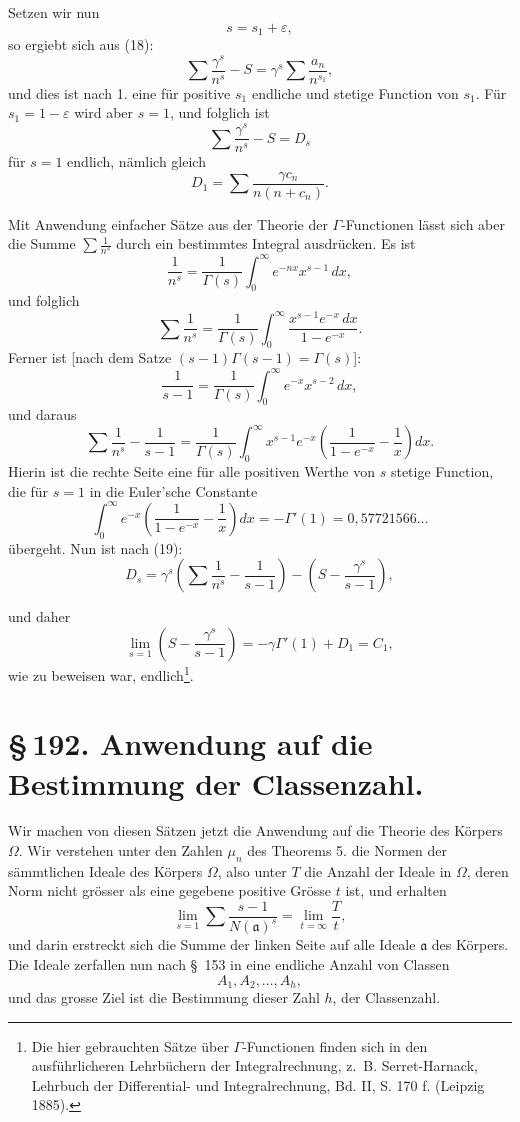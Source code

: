 \documentclass[11pt]{article}
\begin{document}
Setzen wir nun
\[
s=s_1+\varepsilon,
\]
so ergiebt sich aus (18):
\[
\sum\frac{\gamma^s}{n^s}-S=\gamma^s\sum\frac{a_n}{n^{s_1}},
\]
und dies ist nach 1. eine für positive $s_1$ endliche und stetige Function von $s_1$. Für $s_1=1-\varepsilon$ wird aber $s=1$, und folglich ist
\begin{equation}
\sum\frac{\gamma^s}{n^s}-S=D_s
\tag{19}
\end{equation}
für $s=1$ endlich, nämlich gleich
\[
D_1=\sum\frac{\gamma c_n}{n(n+c_n)}.
\]

Mit Anwendung einfacher Sätze aus der Theorie der $\Gamma$-Functionen lässt sich aber die Summe $\sum\frac1{n^s}$ durch ein bestimmtes Integral ausdrücken. Es ist
\[
\frac1{n^s}=\frac1{\Gamma(s)}\int_0^\infty e^{-nx}x^{s-1}\,dx,
\]
und folglich
\[
\sum\frac1{n^s}=\frac1{\Gamma(s)}\int_0^\infty \frac{x^{s-1}e^{-x}\,dx}{1-e^{-x}}.
\]
Ferner ist [nach dem Satze $(s-1)\Gamma(s-1)=\Gamma(s)$]:
\[
\frac1{s-1}=\frac1{\Gamma(s)}\int_0^\infty e^{-x}x^{s-2}\,dx,
\]
und daraus
\[
\sum\frac1{n^s}-\frac1{s-1}
=\frac1{\Gamma(s)}\int_0^\infty x^{s-1}e^{-x}
\left(\frac1{1-e^{-x}}-\frac1x\right)dx.
\]
Hierin ist die rechte Seite eine für alle positiven Werthe von $s$ stetige Function, die für $s=1$ in die Euler'sche Constante
\[
\int_0^\infty e^{-x}\left(\frac1{1-e^{-x}}-\frac1x\right)dx
=-\Gamma'(1)=0{,}57721566\ldots
\]
übergeht. Nun ist nach (19):
\[
D_s=\gamma^s\left(\sum\frac1{n^s}-\frac1{s-1}\right)
-\left(S-\frac{\gamma^s}{s-1}\right),
\]

und daher
\begin{equation}
\lim_{s=1}\left(S-\frac{\gamma^s}{s-1}\right)
=-\gamma\Gamma'(1)+D_1=C_1,
\tag{20}
\end{equation}
wie zu beweisen war, endlich\footnote{Die hier gebrauchten Sätze über $\Gamma$-Functionen finden sich in den ausführlicheren Lehrbüchern der Integralrechnung, z.\ B. Serret-Harnack, Lehrbuch der Differential- und Integralrechnung, Bd. II, S. 170 f. (Leipzig 1885).}.
\section*{\S\,192. Anwendung auf die Bestimmung der Classenzahl.}

Wir machen von diesen Sätzen jetzt die Anwendung auf die Theorie des Körpers $\Omega$. Wir verstehen unter den Zahlen $\mu_n$ des Theorems 5. die Normen der sämmtlichen Ideale des Körpers $\Omega$, also unter $T$ die Anzahl der Ideale in $\Omega$, deren Norm nicht grösser als eine gegebene positive Grösse $t$ ist, und erhalten
\begin{equation}
\lim_{s=1}\sum\frac{s-1}{N(\mathfrak a)^s}=\lim_{t=\infty}\frac{T}{t},
\tag{1}
\end{equation}
und darin erstreckt sich die Summe der linken Seite auf alle Ideale $\mathfrak a$ des Körpers. Die Ideale zerfallen nun nach \S~153 in eine endliche Anzahl von Classen
\[
A_1,A_2,\ldots,A_h,
\]
und das grosse Ziel ist die Bestimmung dieser Zahl $h$, der Classenzahl.
\end{document}
